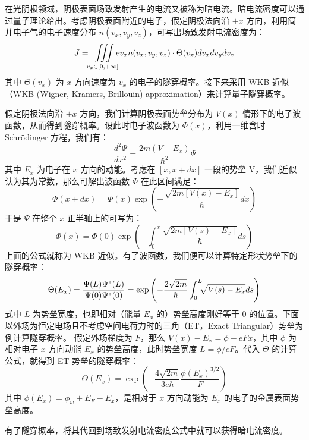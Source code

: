 在光阴极领域，阴极表面场致发射产生的电流又被称为暗电流。暗电流密度可以通过量子理论给出。考虑阴极表面附近的电子，假定阴极法向沿 $+x$ 方向，利用简并电子气的电子速度分布 $n(v_x, v_y, v_z)$，可写出场致发射电流密度为：
	\[
	J = \iiint\limits_{v_x \in [0, +\infty]}\!\!\! ev_xn(v_x, v_y, v_z)\cdot \Theta(v_x)dv_xdv_ydv_z
	\]
	其中 $\Theta(v_x)$ 为 $x$ 方向速度为 $v_x$ 的电子的隧穿概率。接下来采用 WKB 近似（WKB (Wigner, Kramers, Brillouin) approximation）来计算量子隧穿概率。

	假定阴极法向沿 $+x$ 方向，我们计算阴极表面势垒分布为 $V(x)$ 情形下的电子波函数，从而得到隧穿概率。设此时电子波函数为 $\Phi(x)$，利用一维含时 Schr\"odinger 方程，我们有：
	\[\frac{d^2\Psi}{dx^2}=\frac{2m(V-E_x)}{\hbar^2}\Psi\]
	其中 $E_x$ 为电子在 $x$ 方向的动能。考虑在 $[x, x+dx]$ 一段的势垒 V，我们近似认为其为常数，那么可解出波函数 $\Phi$ 在此区间满足：
	\[\Phi(x+dx)=\Phi(x)\exp\left(-\frac{\sqrt{2m[V(x)-E_x]}}{\hbar}dx\right)\]
	于是 $\Psi$ 在整个 $x$ 正半轴上的可写为：
	\[\Phi(x)=\Phi(0)\exp\left(-\int_0^x\frac{\sqrt{2m[V(s)-E_x]}}{\hbar}ds\right)\]
	上面的公式就称为 WKB 近似。有了波函数，我们便可以计算特定形状势垒下的隧穿概率：
	\[\Theta(E_x)=\frac{\Psi(L)\Psi^*(L)}{\Psi(0)\Psi^*(0)}=\exp\left(-\frac{2\sqrt{2m}}{\hbar}\int_0^L\!\!\!\sqrt{V(s)-E_x}ds\right)\]
	式中 $L$ 为势垒宽度，也即相对（能量 $E_x$ 的）势垒高度刚好等于 0 的位置。下面以外场为恒定电场且不考虑空间电荷力时的三角（ET，Exact Triangular）势垒为例计算隧穿概率。
	假定外场梯度为 $F$，那么 $V(x)-E_x=\phi-eFx$，其中 $\phi$ 为相对电子 $x$ 方向动能 $E_x$ 的势垒高度，此时势垒宽度 $L=\phi/eF$。代入 $\Theta$ 的计算公式，就得到 ET 势垒的隧穿概率：
	\begin{equation}
	\Theta(E_x)=\exp\left(-\frac{4\sqrt{2m}}{3e\hbar}\frac{\phi(E_x)^{3/2}}{F}\right)
	\end{equation}
	其中 $\phi(E_x)=\phi_w+E_F-E_x$，是相对于 $x$ 方向动能为 $E_x$ 的电子的金属表面势垒高度。
	
	有了隧穿概率，将其代回到场致发射电流密度公式中就可以获得暗电流密度。

